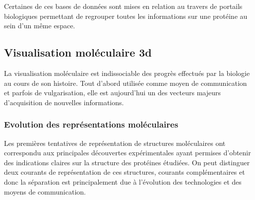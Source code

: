 Certaines de ces bases de données sont mises en relation au travers de portails biologiques permettant de regrouper toutes les informations sur une protéine au sein d'un même espace.

\subsection{Visualisation moléculaire 3d} \label{visu_molecular}

La visualisation moléculaire est indissociable des progrès effectués par la biologie au cours de son histoire. Tout d'abord utilisée comme moyen de communication et parfois de vulgarisation, elle est aujourd'hui un des vecteurs majeurs d'acquisition de nouvelles informations.

\subsubsection{Evolution des représentations moléculaires}

Les premières tentatives de représentation de structures moléculaires ont correspondu aux principales découvertes expérimentales ayant permises d'obtenir des indications claires sur la structure des protéines étudiées. On peut distinguer deux courants de représentation de ces structures, courants complémentaires et donc la séparation est principalement due à l'évolution des technologies et des moyens de communication.

